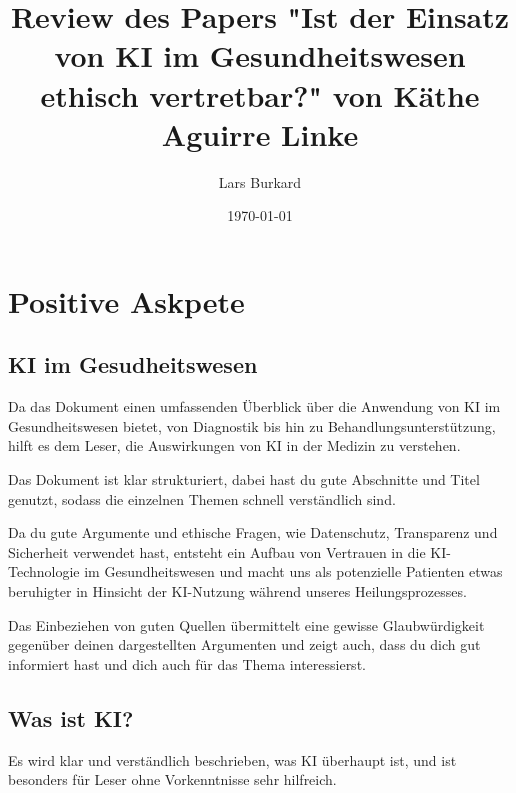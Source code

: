 \documentclass{article}
\title{Review des Papers "Ist der Einsatz von KI im Gesundheitswesen ethisch vertretbar?" von Käthe Aguirre Linke}
\author{Lars Burkard}
\date{\today}
\begin{document}
\maketitle

\vspace{15mm}\tableofcontents

\printbibliography


\vspace{117mm}

\section{Positive Askpete}
\vspace{3mm}\subsection{KI im Gesudheitswesen}
 Da das Dokument einen umfassenden Überblick über die Anwendung von KI im Gesundheitswesen bietet, von Diagnostik bis hin zu Behandlungsunterstützung, hilft es dem Leser, die Auswirkungen von KI in der Medizin zu verstehen.

 \vspace{2mm}Das Dokument ist klar strukturiert, dabei hast du gute Abschnitte und Titel genutzt, sodass die einzelnen Themen schnell verständlich sind.

 \vspace{2mm}Da du gute Argumente und ethische Fragen, wie Datenschutz, Transparenz und Sicherheit verwendet hast, entsteht ein Aufbau von Vertrauen in die KI-Technologie im Gesundheitswesen und macht uns als potenzielle Patienten etwas beruhigter in Hinsicht der KI-Nutzung während unseres Heilungsprozesses.

 \vspace{2mm}Das Einbeziehen von guten Quellen übermittelt eine gewisse Glaubwürdigkeit gegenüber deinen dargestellten Argumenten und zeigt auch, dass du dich gut informiert hast und dich auch für das Thema interessierst.

\vspace{3mm}\subsection{Was ist KI?} 
Es wird klar und verständlich beschrieben, was KI überhaupt ist, und ist besonders für Leser ohne Vorkenntnisse sehr hilfreich.
\end{document}
